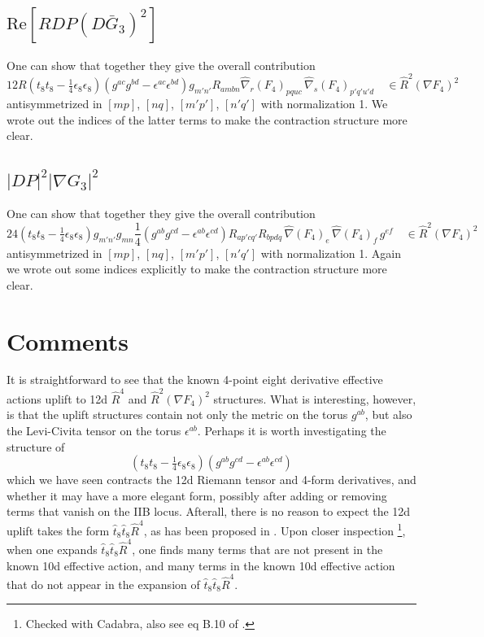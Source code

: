 \subsection{$\text{Re}[R DP (D\bar{G}_3)^2]$}
One can show that together they give the overall contribution
\begin{equation}
12R(t_8t_8-\tfrac14 \epsilon_8 \epsilon_8)(g^{ac}g^{bd} - \epsilon^{ac}\epsilon^{bd})g_{m' n'}R_{ambn}\hat{\nabla}_r(F_4)_{pquc}\,\hat{\nabla}_s(F_4)_{p'q'u'd}
\quad \in \hat{R}^2 (\nabla F_4)^2
\end{equation}
antisymmetrized in $[mp]$, $[nq]$, $[m'p']$, $[n'q']$ with normalization 1.
We wrote out the indices of the latter terms to make the contraction structure more clear.

\subsection{$|DP|^2|\nabla G_3|^2$}
One can show that together they give the overall contribution
\begin{equation}
24(t_8t_8 - \tfrac14 \epsilon_8 \epsilon_8) g_{m'n'}g_{mn} \frac{1}{4}(g^{ab}g^{cd} - \epsilon^{ab}\epsilon^{cd})R_{a p' c q'}R_{b p d q}
\,\hat{\nabla}(F_4)_e \,\hat{\nabla}(F_4)_f\, g^{ef}
\quad \in \hat{R}^2 (\nabla F_4)^2
\end{equation}
antisymmetrized in $[mp]$, $[nq]$, $[m'p']$, $[n'q']$ with normalization 1.
Again we wrote out some indices explicitly to make the contraction structure more clear.

\section{Comments}
It is straightforward to see that the known 4-point eight derivative effective actions uplift to 12d $\hat{R}^4$ and $\hat{R}^2 (\nabla F_4)^2$ structures.
What is interesting, however, is that the uplift structures contain not only the metric on the torus $g^{ab}$, but also the Levi-Civita tensor on the torus $\epsilon^{ab}$.
Perhaps it is worth investigating the structure of
\begin{equation}
(t_8t_8 - \tfrac14 \epsilon_8 \epsilon_8)(g^{ab}g^{cd} - \epsilon^{ab}\epsilon^{cd})
\end{equation}
which we have seen contracts the 12d Riemann tensor and 4-form derivatives, and whether it may have a more elegant form, possibly after adding or removing terms that vanish on the IIB locus.
Afterall, there is no reason to expect the 12d uplift takes the form $\hat{t}_8\hat{t}_8 \hat{R}^4$, as has been proposed in \cite{Minasian:2015bxa}.
Upon closer inspection \footnote{Checked with Cadabra, also see eq B.10 of \cite{Minasian:2015bxa}.}, when one expands $\hat{t}_8\hat{t}_8 \hat{R}^4$, one finds many terms that are not present in the known 10d effective action, and many terms in the known 10d effective action that do not appear in the expansion of $\hat{t}_8\hat{t}_8 \hat{R}^4$.

